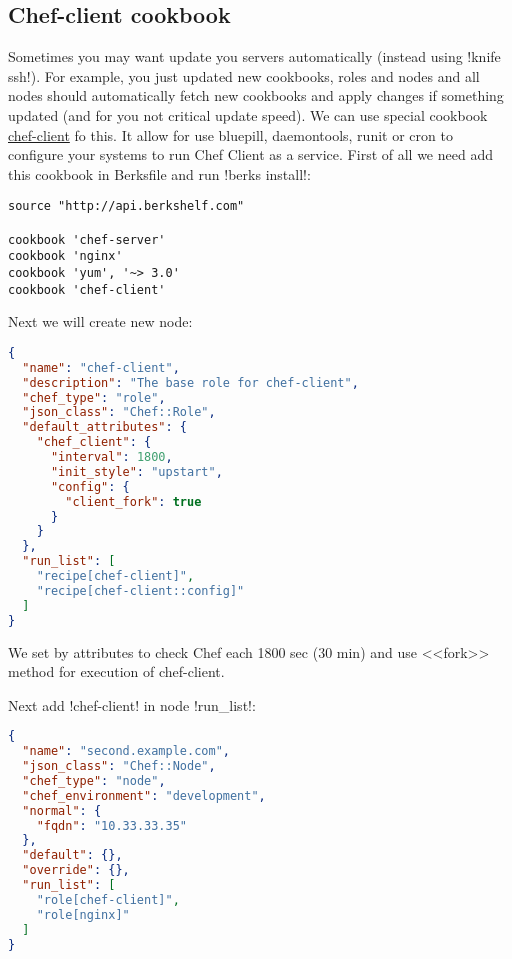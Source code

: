 \subsection{Chef-client cookbook}

Sometimes you may want update you servers automatically (instead using \inline!knife ssh!). For example, you just updated new cookbooks, roles and nodes and all nodes should automatically fetch new cookbooks and apply changes if something updated (and for you not critical update speed). We can use special cookbook \href{http://community.opscode.com/cookbooks/chef-client}{chef-client} fo this. It allow for use bluepill, daemontools, runit or cron to configure your systems to run Chef Client as a service. First of all we need add this cookbook in Berksfile and run \inline!berks install!:

\begin{lstlisting}[label=lst:my-server-cloud-knife-ssh6,title=my-server-cloud/Berksfile]
source "http://api.berkshelf.com"

cookbook 'chef-server'
cookbook 'nginx'
cookbook 'yum', '~> 3.0'
cookbook 'chef-client'
\end{lstlisting}

Next we will create new node:

\begin{lstlisting}[language=JSON,label=lst:my-server-cloud-knife-ssh7,title=my-server-cloud/roles/chef-client.json]
{
  "name": "chef-client",
  "description": "The base role for chef-client",
  "chef_type": "role",
  "json_class": "Chef::Role",
  "default_attributes": {
    "chef_client": {
      "interval": 1800,
      "init_style": "upstart",
      "config": {
        "client_fork": true
      }
    }
  },
  "run_list": [
    "recipe[chef-client]",
    "recipe[chef-client::config]"
  ]
}
\end{lstlisting}

We set by attributes to check Chef each 1800 sec (30 min) and use <<fork>> method for execution of chef-client.

Next add \inline!chef-client! in node \inline!run_list!:

\begin{lstlisting}[language=JSON,label=lst:my-server-cloud-knife-ssh8,title=my-server-cloud/nodes/second.example.com.json]
{
  "name": "second.example.com",
  "json_class": "Chef::Node",
  "chef_type": "node",
  "chef_environment": "development",
  "normal": {
    "fqdn": "10.33.33.35"
  },
  "default": {},
  "override": {},
  "run_list": [
    "role[chef-client]",
    "role[nginx]"
  ]
}
\end{lstlisting}

